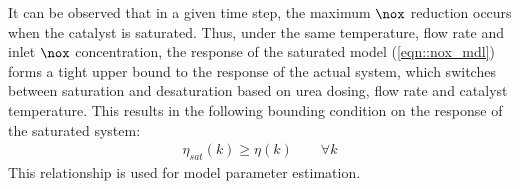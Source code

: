 
It can be observed that in a given time step, the maximum $\nox$ reduction occurs when the catalyst is saturated. Thus,
under the same temperature, flow rate and inlet $\nox$ concentration, the response of the saturated model
(\ref{eqn::nox_mdl}) forms a tight upper bound to the response of the actual system, which switches between saturation
and desaturation based on urea dosing, flow rate and catalyst temperature. This results in the following bounding
condition on the response of the saturated system:
\begin{align}
        \eta_{sat}(k) \geq \eta(k) \qquad \forall k
        \label{eqn::eta_bound}
\end{align}
This relationship is used for model parameter estimation.
